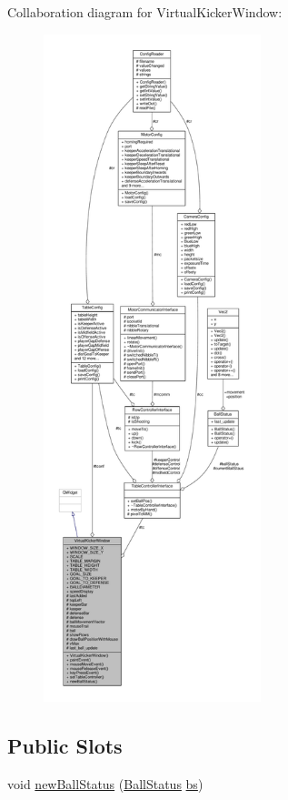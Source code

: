 Collaboration diagram for Virtual\+Kicker\+Window\+:\nopagebreak
\begin{figure}[H]
\begin{center}
\leavevmode
\includegraphics[height=550pt]{class_virtual_kicker_window__coll__graph}
\end{center}
\end{figure}
\subsection*{Public Slots}
\begin{DoxyCompactItemize}
\item 
void \hyperlink{class_virtual_kicker_window_a33c23d35502f7c82ab6f75f61280a876}{new\+Ball\+Status} (\hyperlink{class_ball_status}{Ball\+Status} \hyperlink{jquery_8js_ae77642f8ef73fb9c20c2a737d956acda}{bs})
\end{DoxyCompactItemize}
